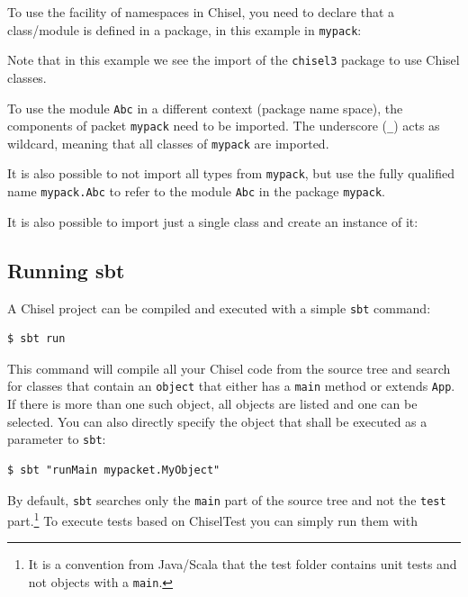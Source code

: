 \documentclass[%
    10pt,
    headinclude, footexclude,
    openright, %
    notitlepage,
    cleardoubleempty,
    headsepline,
    pointlessnumbers,
    bibtotoc, idxtotoc,
    ]{scrbook}
\newcommand{\code}[1]{{\small{\texttt{#1}}}}
\newcommand{\codefoot}[1]{{\footnotesize{\texttt{#1}}}}
\begin{document}
To use the facility of namespaces in Chisel, you need to declare that a class/module
is defined in a package, in this example in \code{mypack}:


\noindent Note that in this example we see the import of the \code{chisel3} package
to use Chisel classes.

To use the module \code{Abc} in a different context (package name space),
the components of packet \code{mypack} need to be imported. The underscore
(\code{\_}) acts as wildcard, meaning that all classes of \code{mypack} are imported.


\noindent It is also possible to not import all types from \code{mypack},
but use the fully qualified name \code{mypack.Abc} to refer to the module
\code{Abc} in the package \code{mypack}.


\noindent It is also possible to import just a single class and create an instance of it:



\subsection{Running sbt}

A Chisel project can be compiled and executed with a simple \code{sbt} command:

\begin{verbatim}
$ sbt run
\end{verbatim}

This command will compile all your Chisel code from the source tree and search
for classes that contain an \code{object} that either has a \code{main} method or
extends \code{App}. If there is more than one such object, all objects are listed and
one can be selected.
You can also directly specify the object that shall be executed as a parameter to \code{sbt}:

\begin{verbatim}
$ sbt "runMain mypacket.MyObject"
\end{verbatim}

By default, \code{sbt} searches only the \code{main} part of the source tree and not
the \code{test} part.\footnote{It is a convention from Java/Scala that the test folder contains
unit tests and not objects with a \codefoot{main}.}
To execute tests based on ChiselTest you can simply run them with
\end{document}
